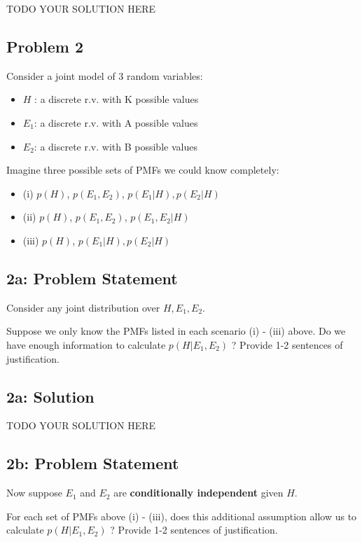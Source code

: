 \documentclass[10pt]{article}
\newcommand{\officialdirections}[1]{{\color{purple} #1}}
\begin{document}
TODO YOUR SOLUTION HERE

\officialdirections{
\subsection*{Problem 2}

Consider a joint model of 3 random variables:

\begin{itemize}
\item $H$ : a discrete r.v. with K possible values
\item $E_1$: a discrete r.v.  with A possible values
\item $E_2$: a discrete r.v. with B possible values
\end{itemize}

Imagine three possible sets of PMFs we could know completely:

\begin{itemize}
\item (i) $p(H)$, $p(E_1, E_2)$, $p(E_1|H), p(E_2|H)$
\item (ii) $p(H)$, $p(E_1, E_2)$, $p(E_1, E_2|H)$
\item (iii) $p(H)$, $p(E_1|H), p(E_2|H)$
\end{itemize}
}

\officialdirections{
\subsection*{2a: Problem Statement}
Consider any joint distribution over $H, E_1, E_2$.

Suppose we only know the PMFs listed in each scenario (i) - (iii) above. Do we have enough information to calculate $p(H | E_1, E_2)$ ? Provide 1-2 sentences of justification.
}

\subsection{2a: Solution}
TODO YOUR SOLUTION HERE

\officialdirections{
\subsection*{2b: Problem Statement}
Now suppose $E_1$ and $E_2$ are \textbf{conditionally independent} given $H$.

For each set of PMFs above (i) - (iii), does this additional assumption allow us to calculate $p(H | E_1, E_2)$ ? Provide 1-2 sentences of justification.
}
\end{document}
